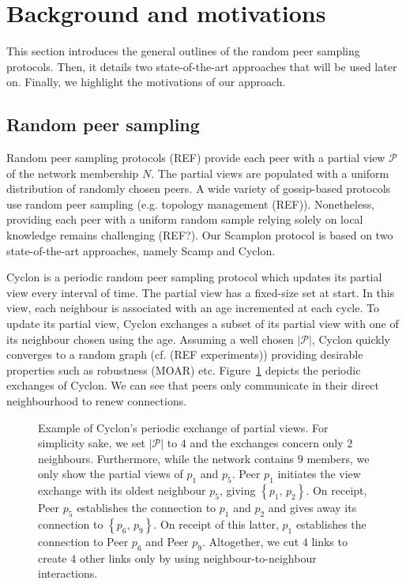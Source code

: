 
\section{Background and motivations}
\label{sec:background}

This section introduces the general outlines of the random peer sampling
protocols. Then, it details two state-of-the-art approaches that will be used
later on. Finally, we highlight the motivations of our approach.

\subsection{Random peer sampling}
Random peer sampling protocols (REF) provide each peer with a partial view
$\mathcal{P}$ of the network membership $N$. The partial views are populated
with a uniform distribution of randomly chosen peers. A wide variety of
gossip-based protocols use random peer sampling (e.g. topology management
(REF)). Nonetheless, providing each peer with a uniform random sample relying
solely on local knowledge remains challenging (REF?).  Our Scamplon protocol is
based on two state-of-the-art approaches, namely Scamp and Cyclon.

\begin{asparadesc}
\item [Cyclon]\cite{voulgaris2005cyclon} is a periodic random peer sampling
  protocol which updates its partial view every interval of time. The partial
  view has a fixed-size set at start. In this view, each neighbour is
  associated with an age incremented at each cycle. To update its partial view,
  Cyclon exchanges a subset of its partial view with one of its neighbour
  chosen using the age.  Assuming a well chosen $|\mathcal{P}|$, Cyclon quickly
  converges to a random graph (cf. (REF experiments)) providing desirable
  properties such as robustness (MOAR) etc.  Figure~\ref{fig:cyclonexample}
  depicts the periodic exchanges of Cyclon. We can see that peers only
  communicate in their direct neighbourhood to renew connections.
\end{asparadesc}

\begin{figure}
  \centering
  
  \caption{\label{fig:cyclonexample}Example of Cyclon's periodic exchange of
    partial views. For simplicity sake, we set $|\mathcal{P}|$ to $4$ and the
    exchanges concern only $2$ neighbours. Furthermore, while the network
    contains $9$ members, we only show the partial views of $p_1$ and $p_5$.
    Peer $p_1$ initiates the view exchange with its oldest neighbour $p_5$,
    giving $\left\{p_1,\,p_2\right\}$. On receipt, Peer $p_5$ establishes the
    connection to $p_1$ and $p_2$ and gives away its connection to
    $\left\{p_6,\,p_9\right\}$.  On receipt of this latter, $p_1$ establishes
    the connection to Peer $p_6$ and Peer $p_9$. Altogether, we cut $4$ links
    to create $4$ other links only by using neighbour-to-neighbour
    interactions.}
\end{figure}


